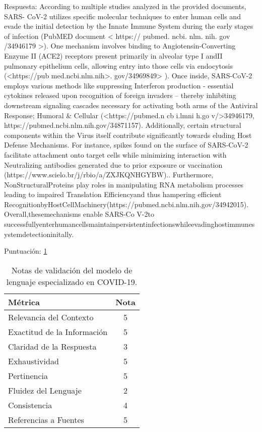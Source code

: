 Respuesta: According to multiple studies analyzed in the provided documents, SARS- CoV-2 utilizes specific molecular techniques to enter human cells and evade the initial detection by the Innate Immune System during the early stages of infection (PubMED document < https:// pubmed. ncbi. nlm. nih. gov /34946179 >). One mechanism involves binding to Angiotensin-Converting Enzyme II (ACE2) receptors present primarily in alveolar type I andII pulmonary epithelium cells, allowing entry into those cells via endocytosis (<https://pub med.ncbi.nlm.nih>. gov/34969849> ). Once inside, SARS-CoV-2 employs various methods like suppressing Interferon production - essential cytokines released upon recognition of foreign invaders – thereby inhibiting downstream signaling cascades necessary for activating both arms of the Antiviral Response; Humoral \& Cellular (<https://pubmed.n cb i.lmni h.go v/>34946179, https://pubmed.ncbi.nlm.nih.gov/34871157). Additionally, certain structural components within the Virus itself contribute significantly towards eluding Host Defense Mechanisms. For instance, spikes found on the surface of SARS-CoV-2 facilitate attachment onto target cells while minimizing interaction with Neutralizing antibodies generated due to prior exposure or vaccination (https://www.scielo.br/j/rbio/a/ZXJKQNHGYBW).. Furthermore, NonStructuralProteins play roles in manipulating RNA metabolism processes leading to impaired Translation Efficiencyand thus hampering efficient RecognitionbyHostCellMachinery(https://pubmed.ncbi.nlm.nih.gov/34942015). Overall,thesemechanisms enable SARS-Co V-2to successfullyenterhumancellsmaintainpersistentinfectionswhileevadinghostimmunesystemdetectioninitally.


Puntuación: \ref{tab:validation_scoresd1}

\begin{table}[h]
    \centering
    \begin{adjustbox}{max width=\textwidth}
    \begin{tabular}{|l|c|}
        \hline
        \textbf{Métrica} & \textbf{Nota} \\
        \hline
        Relevancia del Contexto & 5 \\
        \hline
        Exactitud de la Información & 5 \\
        \hline
        Claridad de la Respuesta & 3 \\
        \hline
        Exhaustividad & 5 \\
        \hline
        Pertinencia & 5 \\
        \hline
        Fluidez del Lenguaje & 2 \\
        \hline
        Consistencia & 4 \\
        \hline
        Referencias a Fuentes & 5 \\
        \hline
    \end{tabular}
    \end{adjustbox}
    \caption{Notas de validación del modelo de lenguaje especializado en COVID-19.}
    \label{tab:validation_scoresd1}
\end{table}


